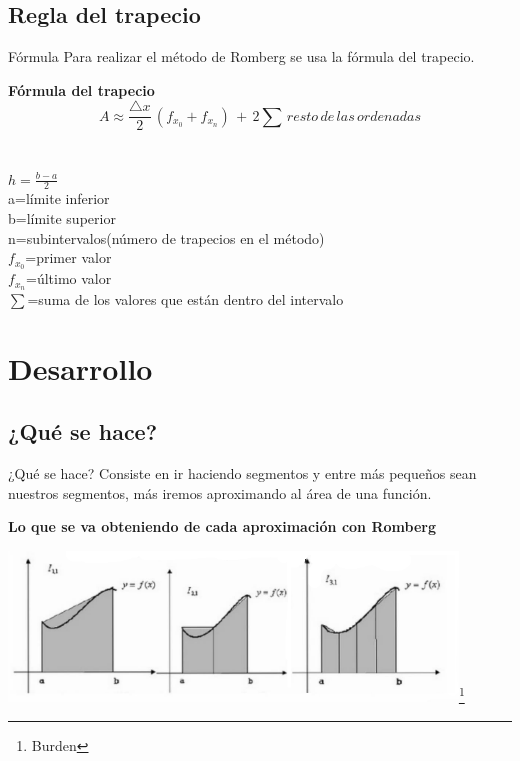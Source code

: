 \documentclass{beamer}
\begin{document}
\subsection{Regla del trapecio}
    \begin{frame}{Fórmula}
Para realizar el método de Romberg se usa la fórmula del trapecio.
\begin{alertblock} 
    {\centering\bf Fórmula del trapecio}
        \[A\approx\frac{\triangle x}{2}\,\left(f_{x_{0}}+f_{x_{n}}\right)\,+\,2\sum\, resto\, de\, las\, ordenadas\]\\
        \\
        {$h=\frac{b-a}{2}$}\\
        a=límite inferior\\
        b=límite superior\\
        n=subintervalos(número de trapecios en el método)\\
        $f_{x_{0}}$=primer valor\\
        $f_{x_{n}}$=último valor\\
        $\sum$=suma de los valores que están dentro del intervalo
        \end{alertblock}
\end{frame}

\section{Desarrollo}
  \subsection{¿Qué se hace?}
        \begin{frame}{¿Qué se hace?}
Consiste en ir haciendo segmentos y entre más pequeños sean nuestros segmentos, más iremos aproximando al área de una función.
  \begin{alertblock}{\centering \bf Lo que se va obteniendo de cada aproximación con Romberg} 
	\begin{center}
		\includegraphics[height=4cm]{fig1.png}\footnote{Burden}\\
    \end{center}
\end{alertblock}
\end{frame}
\end{document}

